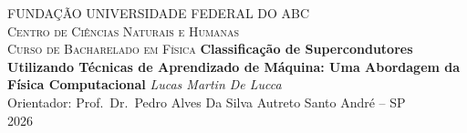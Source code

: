 \documentclass[12pt, a4paper, oneside]{report}
\begin{document}
\begin{titlepage}
    \centering
    \vspace*{1cm}
    {\scshape\Large FUNDAÇÃO UNIVERSIDADE FEDERAL DO ABC \\ Centro de Ciências Naturais e Humanas \\ Curso de Bacharelado em Física}
    \vfill
    {\Huge\bfseries Classificação de Supercondutores Utilizando Técnicas de Aprendizado de Máquina: Uma Abordagem da Física Computacional}
    \vfill
    {\Large\itshape Lucas Martin De Lucca}\\[1cm]
    {\large Orientador: Prof.\ Dr.\ Pedro Alves Da Silva Autreto}
    \vfill
    {\large Santo André -- SP \\ 2026}
\end{titlepage}

\newpage\thispagestyle{empty}\mbox{}
\end{document}
